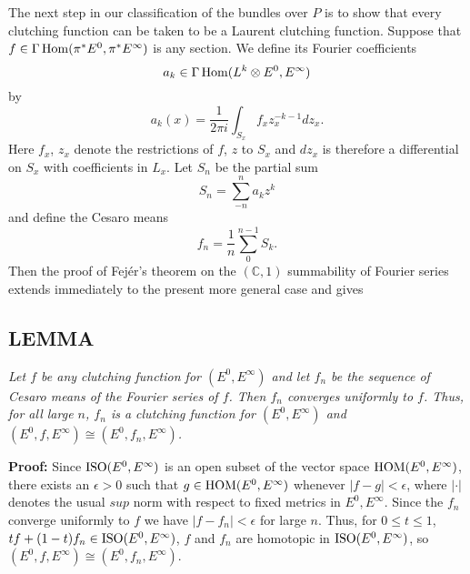 The next step in our classification of the bundles over $P$ is to show that every clutching function can be taken to be a Laurent clutching function. Suppose that $f \in \Gamma\operatorname{Hom}(\pi^* E^0, \pi^* E^\infty)$ is any section. We define its Fourier coefficients
\begin{equation*}
    a_k \in \Gamma\operatorname{Hom}(L^k \otimes E^0, E^\infty)
\end{equation*}
by
\begin{equation*}
    a_k(x) = \frac{1}{2 \pi i} \int_{S_x} f_x z_x^{-k-1} dz_x .
\end{equation*}
Here $f_x$, $z_x$ denote the restrictions of $f$, $z$ to $S_x$ and $dz_x$ is therefore a differential on $S_x$ with coefficients in $L_x$. Let $S_n$ be the partial sum
\begin{equation*}
    S_n = \sum_{-n}^n a_k z^k
\end{equation*}
and define the Cesaro means
\begin{equation*}
    f_n = \frac{1}{n} \sum_0^{n-1} S_k .
\end{equation*}
Then the proof of Fejér's theorem on the $(\mathbb{C}, 1)$ summability of Fourier series extends immediately to the present more general case and gives

\subsection{LEMMA}\label{2.2.4} \textit{Let $f$ be any clutching function for $(E^0, E^\infty)$ and let $f_n$ be the sequence of Cesaro means of the Fourier series of $f$. Then $f_n$ converges uniformly to $f$. Thus, for all large $n$, $f_n$ is a clutching function for $(E^0, E^\infty)$ and $(E^0, f, E^\infty) \cong (E^0, f_n, E^\infty)$.} \par 

\textbf{Proof:} Since $\operatorname{ISO}(E^0, E^\infty)$ is an open subset of the vector space $\operatorname{HOM}(E^0, E^\infty)$, there exists an $\epsilon > 0$ such that $g \in \operatorname{HOM}(E^0, E^\infty)$ whenever $|f - g| < \epsilon$, where $|\cdot|$ denotes the usual $sup$ norm with respect to fixed metrics in $E^0, E^\infty$. Since the $f_n$ converge uniformly to $f$ we have $|f - f_n| < \epsilon$ for large $n$. Thus, for $0 \leq t \leq 1$, $tf + (1-t)f_n \in \operatorname{ISO}(E^0, E^\infty)$, $f$ and $f_n$ are homotopic in $\operatorname{ISO}(E^0, E^\infty)$, so $(E^0, f, E^\infty) \cong (E^0, f_n, E^\infty)$. \par \hfill

